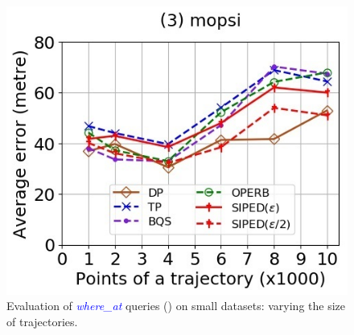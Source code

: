 \begin{figure}[tb!]
	\includegraphics[scale=0.400]{Figures/Exp-where-PED-error-size-mopsi.jpg}		
	\vspace{-2ex}
	\caption{\small Evaluation of \textcolor{blue}{\emph{where\_at}} queries (\ped) on small datasets: varying the size of
		trajectories.}
	\label{fig:query-ped-size}
	\vspace{-1ex}
\end{figure}

